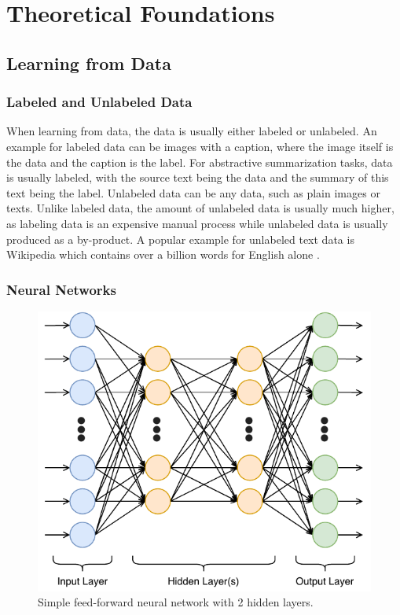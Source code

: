 \chapter{Theoretical Foundations}\label{ch:theoretical-foundations}


\section{Learning from Data}

\subsection{Labeled and Unlabeled Data}

When learning from data, the data is usually either labeled or unlabeled.
An example for labeled data can be images with a caption, where the image itself is the data and the caption is the label.
For abstractive summarization tasks, data is usually labeled, with the source text being the data and the summary of this text being the label.
Unlabeled data can be any data, such as plain images or texts.
Unlike labeled data, the amount of unlabeled data is usually much higher, as labeling data is an expensive manual process while unlabeled data is usually produced as a by-product.
A popular example for unlabeled text data is Wikipedia which contains over a billion words for English alone \cite{wikipediaStats}. 


\subsection{Neural Networks}

\begin{figure}[h]
\centering
\includegraphics[width=0.45\paperwidth]{figures/neural-network}
\caption{Simple feed-forward neural network with 2 hidden layers.}
\label{fig:neural-network}
\end{figure}


